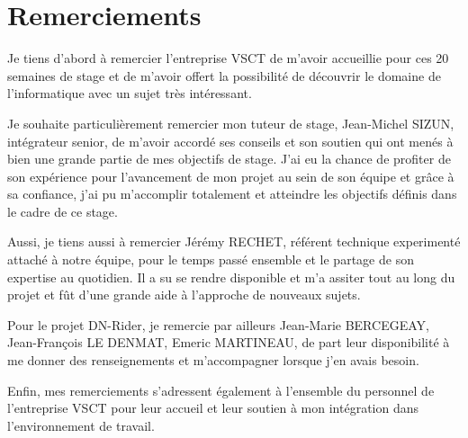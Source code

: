 \chapter*{Remerciements}

Je tiens d’abord à remercier l’entreprise VSCT de m’avoir accueillie pour ces 20 semaines de stage
et de m’avoir offert la possibilité de découvrir le domaine de l'informatique avec un sujet très intéressant.

Je souhaite particulièrement remercier mon tuteur de stage, Jean-Michel SIZUN, intégrateur senior,
de m’avoir accordé ses conseils et son soutien qui ont menés à bien une grande partie de mes objectifs de stage.
J’ai eu la chance de profiter de son expérience pour l’avancement de mon projet au sein de son équipe et grâce à sa confiance,
j'ai pu m'accomplir totalement et atteindre les objectifs définis dans le cadre de ce stage.

Aussi, je tiens aussi à remercier Jérémy RECHET, référent technique experimenté attaché à notre équipe,
pour le temps passé ensemble et le partage de son expertise au quotidien.
Il a su se rendre disponible et m’a assiter tout au long du projet et fût d'une grande aide à l'approche de nouveaux sujets.

Pour le projet DN-Rider, je remercie par ailleurs Jean-Marie BERCEGEAY, Jean-François LE DENMAT, Emeric MARTINEAU, de part leur disponibilité à me donner des
renseignements et m’accompagner lorsque j'en avais besoin.

Enfin, mes remerciements s’adressent également à l’ensemble du personnel de l’entreprise VSCT
pour leur accueil et leur soutien à mon intégration dans l’environnement de travail.
